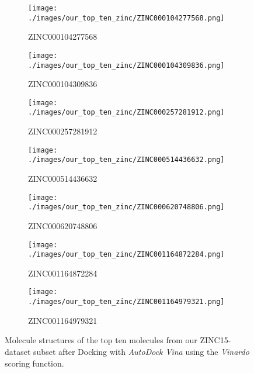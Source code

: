 \documentclass[11pt, letterpaper, titlepage]{article}
\begin{document}
\begin{figure}[h!]
\begin{adjustbox}{minipage=\linewidth,scale=1}
    \begin{subfigure}[b]{0.3\textwidth}
         \centering
         \texttt{[image: ./images/our\_top\_ten\_zinc/ZINC000104277568.png]}
         \caption{ZINC000104277568}
         \label{fig:ZINC000104277568}
     \end{subfigure}
     \hfill
     \begin{subfigure}[b]{0.3\textwidth}
         \centering
         \texttt{[image: ./images/our\_top\_ten\_zinc/ZINC000104309836.png]}
         \caption{ZINC000104309836}
         \label{fig:ZINC000104309836}
     \end{subfigure}
     \hfill
     \begin{subfigure}[b]{0.3\textwidth}
         \centering
         \texttt{[image: ./images/our\_top\_ten\_zinc/ZINC000257281912.png]}
         \caption{ZINC000257281912}
         \label{fig:ZINC000257281912}
     \end{subfigure}
        \begin{subfigure}[b]{0.3\textwidth}
         \centering
         \texttt{[image: ./images/our\_top\_ten\_zinc/ZINC000514436632.png]}
         \caption{ZINC000514436632}
         \label{fig:ZINC000514436632}
     \end{subfigure}
     \hfill
     \begin{subfigure}[b]{0.3\textwidth}
         \centering
         \texttt{[image: ./images/our\_top\_ten\_zinc/ZINC000620748806.png]}
         \caption{ZINC000620748806}
         \label{fig:ZINC000620748806}
     \end{subfigure}
     \hfill
     \begin{subfigure}[b]{0.3\textwidth}
         \centering
         \texttt{[image: ./images/our\_top\_ten\_zinc/ZINC001164872284.png]}
         \caption{ZINC001164872284}
         \label{fig:ZINC001164872284}
     \end{subfigure}

     \hfill
     \begin{subfigure}[b]{\textwidth}
         \centering
         \texttt{[image: ./images/our\_top\_ten\_zinc/ZINC001164979321.png]}
         \caption{ZINC001164979321}
         \label{fig:ZINC001164979321}
     \end{subfigure}
        \caption{Molecule structures of the top ten molecules from our ZINC15-dataset subset after Docking with \textit{AutoDock Vina} using the \textit{Vinardo} scoring function.}
        \label{fig:our_top_ten_zinc}
    \end{adjustbox}
\end{figure}
\end{document}
